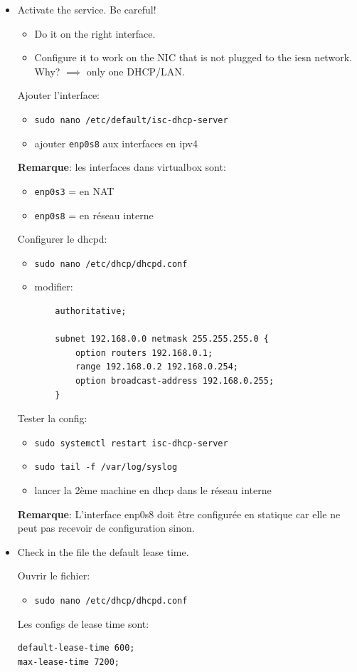 \documentclass[a4paper]{article}
\begin{document}
\begin{itemize}
\item Activate the service. Be careful!
\begin{itemize}
    \item Do it on the right interface.
    \item Configure it to work on the NIC that is not plugged to the iesn network. Why? $ \implies $ only one DHCP/LAN.
\end{itemize}
\begin{example}
    Ajouter l'interface:
    \begin{itemize}
        \item \texttt{sudo nano /etc/default/isc-dhcp-server}
        \item ajouter \texttt{enp0s8} aux interfaces en ipv4
    \end{itemize}
    \textbf{Remarque}: les interfaces dans virtualbox sont:
    \begin{itemize}
        \item \texttt{enp0s3} = en NAT
        \item \texttt{enp0s8} = en réseau interne
    \end{itemize}
    Configurer le dhcpd:
    \begin{itemize}
        \item \texttt{sudo nano /etc/dhcp/dhcpd.conf}
        \item modifier:
        \begin{verbatim}
    authoritative;

    subnet 192.168.0.0 netmask 255.255.255.0 {
        option routers 192.168.0.1;
        range 192.168.0.2 192.168.0.254;
        option broadcast-address 192.168.0.255;
    }
        \end{verbatim}
    \end{itemize}
    Tester la config:
    \begin{itemize}
        \item \texttt{sudo systemctl restart isc-dhcp-server}
        \item \texttt{sudo tail -f /var/log/syslog}
        \item lancer la 2ème machine en dhcp dans le réseau interne
    \end{itemize}
    \textbf{Remarque}: L'interface enp0s8 doit être configurée en statique car elle ne peut pas recevoir de configuration sinon.
\end{example}

\item Check in the file the default lease time.
\begin{example}
    Ouvrir le fichier:
    \begin{itemize}
        \item \texttt{sudo nano /etc/dhcp/dhcpd.conf}
    \end{itemize}
    Les configs de lease time sont:
    \begin{verbatim}
default-lease-time 600;
max-lease-time 7200;
    \end{verbatim}
\end{example}


\end{itemize}
\end{document}
